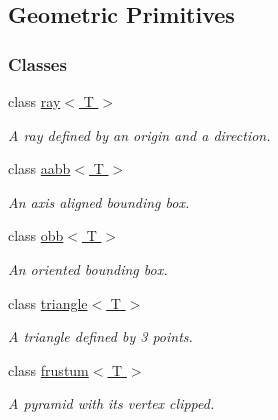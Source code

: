 \hypertarget{group__geometric__primitives}{
\subsection{Geometric Primitives}
\label{group__geometric__primitives}
}
\subsubsection*{Classes}
\begin{DoxyCompactItemize}
\item 
class \hyperlink{classOpenRAVE_1_1geometry_1_1ray}{ray$<$ T $>$}
\begin{DoxyCompactList}\small\item\em A ray defined by an origin and a direction. \item\end{DoxyCompactList}\item 
class \hyperlink{classOpenRAVE_1_1geometry_1_1aabb}{aabb$<$ T $>$}
\begin{DoxyCompactList}\small\item\em An axis aligned bounding box. \item\end{DoxyCompactList}\item 
class \hyperlink{classOpenRAVE_1_1geometry_1_1obb}{obb$<$ T $>$}
\begin{DoxyCompactList}\small\item\em An oriented bounding box. \item\end{DoxyCompactList}\item 
class \hyperlink{classOpenRAVE_1_1geometry_1_1triangle}{triangle$<$ T $>$}
\begin{DoxyCompactList}\small\item\em A triangle defined by 3 points. \item\end{DoxyCompactList}\item 
class \hyperlink{classOpenRAVE_1_1geometry_1_1frustum}{frustum$<$ T $>$}
\begin{DoxyCompactList}\small\item\em A pyramid with its vertex clipped. \item\end{DoxyCompactList}\end{DoxyCompactItemize}

